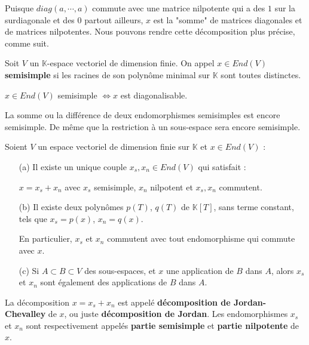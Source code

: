 \documentclass[a4paper,openany,12pt]{report}
\newcommand{\KK}{\mathbb{K}}
\theoremstyle{break}
{\theorembodyfont{\upshape}
\newtheorem*{rmq}{Remarque :}
\newtheorem*{prv}{Preuve :}
\newtheorem*{ex}{Exemples :}
\newtheorem*{exe}{Exemple : }
\newtheorem*{nota}{Notation :}
\newtheorem*{dem}{D\'emonstration :}}
\begin{document}
Puisque $diag(a, \cdots, a)$ commute avec une matrice nilpotente qui a des $1$ sur la surdiagonale et des $0$ partout ailleurs, $x$ est la "somme" de matrices diagonales et de matrices nilpotentes. Nous pouvons rendre cette décomposition plus précise, comme suit. 

\begin{df}
\quad Soit $V$ un $\KK$-espace vectoriel de dimension finie. On appel $x \in End(V)$ \textbf{semisimple} si les racines de son polynôme minimal sur $\KK$ sont toutes distinctes. 
\end{df}

\begin{prop}
\quad $x \in End(V)$ semisimple $\iff x$ est diagonalisable. 
\end{prop}

\begin{rmq}
\quad La somme ou la différence de deux endomorphismes semisimples est encore semisimple. De même que la restriction à un sous-espace sera encore semisimple.
\end{rmq}

\begin{prop}\label{prop:C1}
\quad Soient $V$ un espace vectoriel de dimension finie sur $\KK$ et $x \in End(V)$ :
\begin{itemize}
\item[(a)] Il existe un unique couple $x_{s},x_{n} \in End(V)$ qui satisfait :
\begin{center}
$x=x_{s}+x_{n}$ avec $x_{s}$ semisimple, $x_{n}$ nilpotent et $x_{s},x_{n}$ commutent.
\end{center}

\item[(b)] Il existe deux polynômes $p(T)$, $q(T)$ de $\KK[T]$, sans terme constant, tels que $x_{s}=p(x)$, $x_{n} = q(x)$. 

En particulier, $x_{s}$ et $x_{n}$ commutent avec tout endomorphisme qui commute avec $x$.

\item[(c)] Si $A \subset B \subset V$ des sous-espaces, et $x$ une application de $B$ dans $A$, alors $x_{s}$ et $x_{n}$ sont également des applications de $B$ dans $A$. 
\end{itemize}
\end{prop}

\begin{df}
\quad La décomposition $x = x_{s}+x_{n}$ est appelé \textbf{décomposition de Jordan-Chevalley} de $x$, ou juste \textbf{décomposition de Jordan}. Les endomorphismes $x_{s}$ et $x_{n}$ sont respectivement appelés \textbf{partie semisimple} et \textbf{partie nilpotente} de $x$.
\end{df}
\end{document}
